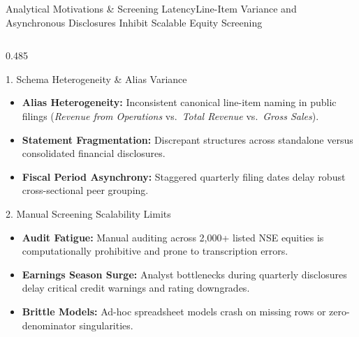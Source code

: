 \begin{frame}{Analytical Motivations \& Screening Latency}{Line-Item Variance and Asynchronous Disclosures Inhibit Scalable Equity Screening}
    \vspace{-0.20cm}
    \begin{columns}[T,onlytextwidth]
        \begin{column}{0.485\textwidth}
            \begin{quantcard}[height=2.74cm]{1. Schema Heterogeneity \& Alias Variance}
                \fontsize{5.8pt}{7.0pt}\selectfont
                \begin{itemize}
                    \setlength{\itemsep}{1.5pt}
                    \item \textbf{Alias Heterogeneity:} Inconsistent canonical line-item naming in public filings (\textit{Revenue from Operations} vs.\ \textit{Total Revenue} vs.\ \textit{Gross Sales}).
                    \item \textbf{Statement Fragmentation:} Discrepant structures across standalone versus consolidated financial disclosures.
                    \item \textbf{Fiscal Period Asynchrony:} Staggered quarterly filing dates delay robust cross-sectional peer grouping.
                \end{itemize}
            \end{quantcard}

            \vspace{0.12cm}

            \begin{quantcard}[height=2.74cm]{2. Manual Screening Scalability Limits}
                \fontsize{5.8pt}{7.0pt}\selectfont
                \begin{itemize}
                    \setlength{\itemsep}{1.5pt}
                    \item \textbf{Audit Fatigue:} Manual auditing across 2,000+ listed NSE equities is computationally prohibitive and prone to transcription errors.
                    \item \textbf{Earnings Season Surge:} Analyst bottlenecks during quarterly disclosures delay critical credit warnings and rating downgrades.
                    \item \textbf{Brittle Models:} Ad-hoc spreadsheet models crash on missing rows or zero-denominator singularities.
                \end{itemize}
            \end{quantcard}
        \end{column}


\end{columns}
\end{frame}
